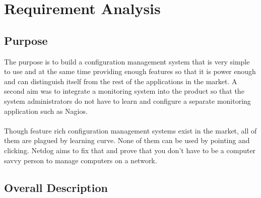 \chapter{Requirement Analysis}

\section{Purpose}

The purpose is to build a configuration management system that is very simple to
use and at the same time providing enough features so that it is power enough
and can distinguish itself from the rest of the applications in the market. A
second aim was to integrate a monitoring system into the product so that the
system administrators do not have to learn and configure a separate monitoring
application such as Nagios.
\\\\
Though feature rich configuration management systems exist in the market, all of
them are plagued by learning curve. None of them can be used by pointing and
clicking. Netdog aims to fix that and prove that you don't have to be a computer
savvy person to manage computers on a network.

\section{Overall Description}

